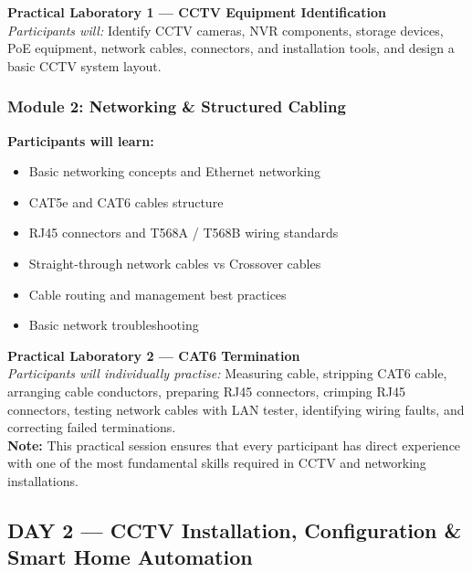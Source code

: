 \documentclass[11pt,a4paper]{article}
\begin{document}
\vspace{4pt}
\begin{tcolorbox}[calloutbox]
\textbf{Practical Laboratory 1 — CCTV Equipment Identification}\\
\textit{Participants will:} Identify CCTV cameras, NVR components, storage devices, PoE equipment, network cables, connectors, and installation tools, and design a basic CCTV system layout.
\end{tcolorbox}

\subsubsection{Module 2: Networking \& Structured Cabling}
\textbf{Participants will learn:}
\begin{itemize}
    \item Basic networking concepts and Ethernet networking
    \item CAT5e and CAT6 cables structure
    \item RJ45 connectors and T568A / T568B wiring standards
    \item Straight-through network cables vs Crossover cables
    \item Cable routing and management best practices
    \item Basic network troubleshooting
\end{itemize}

\vspace{4pt}
\begin{tcolorbox}[calloutbox]
\textbf{Practical Laboratory 2 — CAT6 Termination}\\
\textit{Participants will individually practise:} Measuring cable, stripping CAT6 cable, arranging cable conductors, preparing RJ45 connectors, crimping RJ45 connectors, testing network cables with LAN tester, identifying wiring faults, and correcting failed terminations.\\
\textbf{Note:} This practical session ensures that every participant has direct experience with one of the most fundamental skills required in CCTV and networking installations.
\end{tcolorbox}

\subsection{DAY 2 — CCTV Installation, Configuration \& Smart Home Automation}
\end{document}
